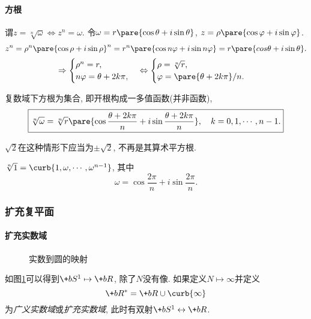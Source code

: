 \documentclass[../ComplexVariable.tex]{subfiles}
\begin{document}
\paragraph{方根} %
\label{par:方根}

谓$z = \sqrt[n]{\omega}\Leftrightarrow z^n = \omega$. 令$\omega = r\pare{\cos\theta + i\sin\theta}$, $z = \rho\pare{\cos\varphi + i\sin\varphi}$.
\[ z^n = \rho^n\pare{\cos\rho+i\sin\rho}^n = r^n\pare{\cos n\varphi + i\sin n\varphi} = r\pare{cos\theta + i\sin\theta}. \]
\[ \Rightarrow \begin{cases}
    \rho^n = r,\\
    n\varphi = \theta + 2k\pi,
\end{cases}\Leftrightarrow \begin{cases}
    \rho = \sqrt[n]{r},\\
    \varphi = \pare{\theta+2k\pi}/n.
\end{cases} \]
\begin{theorem}[方根]
    复数域下方根为集合, 即开根构成一多值函数(并非函数),
    \[ \boxed{\sqrt[n]{\omega} = \sqrt[n]{r} \pare{\cos \frac{\theta+2k\pi}{n} + i\sin \frac{\theta + 2k\pi}{n}},\quad k = 0, 1, \cdots, n-1.} \]
\end{theorem}
\begin{remark}
    $\sqrt{2}$在这种情形下应当为$\pm \sqrt{2}$, 不再是其算术平方根.
\end{remark}
\begin{ex}
    $\sqrt[n]{1} = \curb{1,\omega,\cdots,\omega^{n-1}}$, 其中
    \[ \omega = \cos \frac{2\pi}{n} + i\sin \frac{2\pi}{n}. \]
\end{ex}


\subsubsection{扩充复平面} %
\label{ssub:扩充复平面}

\paragraph{扩充实数域} %
\label{par:扩充实数域}

\begin{figure}[ht]
    \centering
    \caption{实数到圆的映射}
    \label{fig:实数到圆的映射}
\end{figure}
如图\cref{fig:实数到圆的映射}可以得到$\+bS^1\mapsto \+bR$, 除了$N$没有像. 如果定义$N\mapsto \infty$并定义
\[ \+bR^* = \+bR\cup\curb{\infty} \]
为\emph{广义实数域}或\emph{扩充实数域}, 此时有双射$\+bS^1\leftrightarrow \+bR$. 
\end{document}
